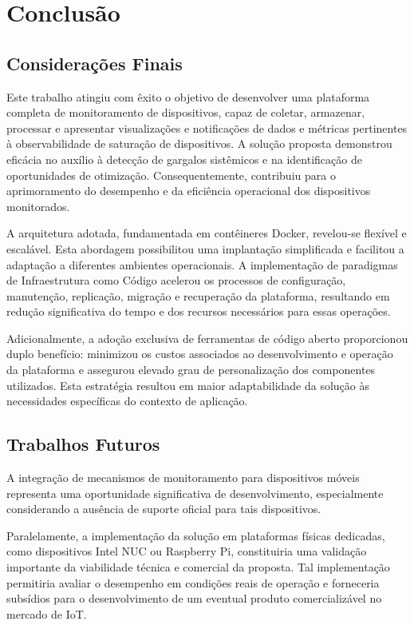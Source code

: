 \chapter{Conclusão}
\label{chap5}

\section{Considerações Finais}
\label{section:ConsideracoesFinais}

Este trabalho atingiu com êxito o objetivo de desenvolver uma plataforma completa de monitoramento de dispositivos, capaz de coletar, armazenar, processar e apresentar visualizações e notificações de dados e métricas pertinentes à observabilidade de saturação de dispositivos. A solução proposta demonstrou eficácia no auxílio à detecção de gargalos sistêmicos e na identificação de oportunidades de otimização. Consequentemente, contribuiu para o aprimoramento do desempenho e da eficiência operacional dos dispositivos monitorados.

A arquitetura adotada, fundamentada em contêineres Docker, revelou-se flexível e escalável. Esta abordagem possibilitou uma implantação simplificada e facilitou a adaptação a diferentes ambientes operacionais. A implementação de paradigmas de Infraestrutura como Código acelerou os processos de configuração, manutenção, replicação, migração e recuperação da plataforma, resultando em redução significativa do tempo e dos recursos necessários para essas operações.

Adicionalmente, a adoção exclusiva de ferramentas de código aberto proporcionou duplo benefício: minimizou os custos associados ao desenvolvimento e operação da plataforma e assegurou elevado grau de personalização dos componentes utilizados. Esta estratégia resultou em maior adaptabilidade da solução às necessidades específicas do contexto de aplicação.

\section{Trabalhos Futuros}
\label{section:TrabalhosFuturos}

A integração de mecanismos de monitoramento para dispositivos móveis representa uma oportunidade significativa de desenvolvimento, especialmente considerando a ausência de suporte oficial para tais dispositivos.

Paralelamente, a implementação da solução em plataformas físicas dedicadas, como dispositivos Intel NUC ou Raspberry Pi, constituiria uma validação importante da viabilidade técnica e comercial da proposta. Tal implementação permitiria avaliar o desempenho em condições reais de operação e forneceria subsídios para o desenvolvimento de um eventual produto comercializável no mercado de IoT.

